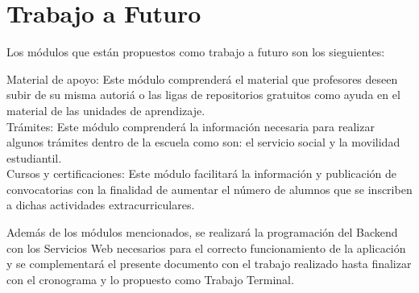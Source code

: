 
\section{Trabajo a Futuro}

Los módulos que están propuestos como trabajo a futuro son los sieguientes: \\

\begin{UClist} 
	\UCli Material de apoyo: 
	Este módulo comprenderá el material que profesores deseen subir de su misma autoriá o las ligas de repositorios gratuitos como ayuda en el material de las unidades de aprendizaje.\\
	
	\UCli Trámites: 
	Este módulo comprenderá la información necesaria para realizar algunos trámites dentro de la escuela como son: el servicio social y la movilidad estudiantil.\\
	
	\UCli Cursos y certificaciones: 
	Este módulo facilitará la información y publicación de convocatorias con la finalidad de aumentar el número de alumnos que se inscriben a dichas actividades extracurriculares.\\
\end{UClist} 

Además de los módulos mencionados, se realizará la programación del Backend con los Servicios Web necesarios para el correcto funcionamiento de la aplicación y se complementará el presente documento con el trabajo realizado hasta finalizar con el cronograma y lo propuesto como Trabajo Terminal.